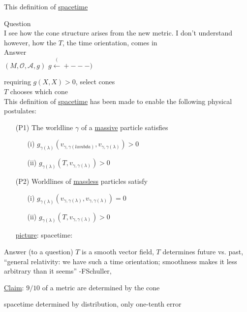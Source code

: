 \documentclass[10pt, twoside]{amsart}
\begin{document}
\begin{multicols*}{2}
This definition of \underline{spacetime}

Question \\
I see how the cone structure arises from the new metric. I don't understand however, how the $T$, the time orientation, comes in \\

Answer \\
$(M,\mathcal{O}, \mathcal{A},g)$ $g \xleftarrow (+---)$

requiring $g(X,X)>0$, select cones \\
$T$ chooses which cone \\

This definition of \underline{spacetime} has been made to enable the following physical postulates:
\begin{enumerate}
\item[(P1)] The worldline $\gamma$ of a \underline{massive} particle satisfies
\begin{enumerate}
  \item[(i)] $g_{\gamma(\lambda)}(v_{\gamma, \gamma(lambda)} , v_{\gamma,\gamma(\lambda)} ) >0$
  \item[(ii)] $g_{\gamma(\lambda)}(T, v_{\gamma,\gamma(\lambda)}) >0$
\end{enumerate}
\item[(P2)] Worldlines of \underline{massless} particles satisfy
\begin{enumerate}
\item[(i)] $g_{\gamma(\lambda)}(v_{\gamma,\gamma(\lambda)}, v_{\gamma,\gamma(\lambda)}) = 0$
\item[(ii)] $g_{\gamma(\lambda)}(T,v_{\gamma,\gamma(\lambda)}) >0$
\end{enumerate}
\underline{picture}: spacetime:
\end{enumerate}

Answer (to a question) $T$ is a smooth vector field, $T$ determines future vs. past, ``general relativity: we have such a time orientation; smoothness makes it less arbitrary than it seems'' -FSchuller,


\underline{Claim}: $9/10$ of a metric are determined by the cone

spacetime determined by distribution, only one-tenth error 


\end{multicols*}
\end{document}

